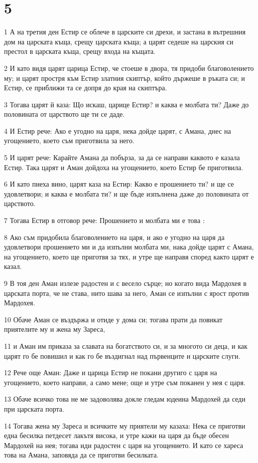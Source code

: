 \chapter{5}

\par 1 А на третия ден Естир се облече в царските си дрехи, и застана в вътрешния дом на царската къща, срещу царската къща; а царят седеше на царския си престол в царската къща, срещу входа на къщата.
\par 2 И като видя царят царица Естир, че стоеше в двора, тя придоби благоволението му; и царят простря към Естир златния скиптър, който държеше в ръката си; и Естир, се приближи та се допря до края на скиптъра.
\par 3 Тогава царят й каза: Що искаш, царице Естир? и каква е молбата ти? Даже до половината от царството ще ти се даде.
\par 4 И Естир рече: Ако е угодно на царя, нека дойде царят, с Амана, днес на угощението, което съм приготвила за него.
\par 5 И царят рече: Карайте Амана да побърза, за да се направи каквото е казала Естир. Така царят и Аман дойдоха на угощението, което Естир бе приготвила.
\par 6 И като пиеха вино, царят каза на Естир: Какво е прошението ти? и ще се удовлетвори; и каква е молбата ти? и ще бъде изпълнена даже до половината от царството.
\par 7 Тогава Естир в отговор рече: Прошението и молбата ми е това :
\par 8 Ако съм придобила благоволението на царя, и ако е угодно на царя да удовлетвори прошението ми и да изпълни молбата ми, нака дойде царят с Амана, на угощението, което ще приготвя за тях, и утре ще направя според както царят е казал.
\par 9 В тоя ден Аман излезе радостен и с весело сърце; но когато вида Мардохея в царската порта, че не става, нито шава за него, Аман се изпълни с ярост против Мардохея.
\par 10 Обаче Аман се въздържа и отиде у дома си; тогава прати да повикат приятелите му и жена му Зареса,
\par 11 и Аман им приказа за славата на богатството си, и за многото си деца, и как царят го бе повишил и как го бе въздигнал над първенците и царските слуги.
\par 12 Рече още Аман: Даже и царица Естир не покани другиго с царя на угощението, което направи, а само мене; още и утре съм поканен у нея с царя.
\par 13 Обаче всичко това не ме задоволява докле гледам юдеина Мардохей да седи при царската порта.
\par 14 Тогава жена му Зареса и всичките му приятели му казаха: Нека се приготви една бесилка петдесет лакътя висока, и утре кажи на царя да бъде обесен Мардохей на нея; тогава иди радостен с царя на угощението. И като се хареса това на Амана, заповяда да се приготви бесилката.

